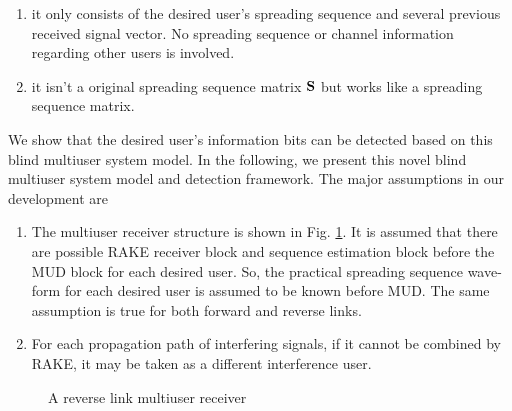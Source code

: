\documentclass[a4paper,11pt,fleqn]{article}
\newcommand{\bS}{{\bf S}}
\begin{document}
\begin{enumerate}

\item it only consists of the desired user's spreading sequence
and several previous received signal vector. No spreading sequence
or channel information regarding other users is involved.

\item it isn't a original spreading sequence matrix $\bS$ but
works like a spreading sequence matrix.

\end{enumerate}

\noindent We show that the desired user's information bits can be
detected based on this blind multiuser system model. In the
following, we present this novel blind multiuser system model and
detection framework. The major assumptions in our development are

\begin{enumerate}

\item The multiuser receiver structure is shown in Fig.
\ref{CDMA_links}. It is assumed that there are possible RAKE
receiver block and sequence estimation block before the MUD block
for each desired user. So, the practical spreading sequence
wave-form for each desired user is assumed to be known before MUD.
The same assumption is true for both forward and reverse links.

\item For each propagation path of interfering signals, if it
cannot be combined by RAKE, it may be taken as a different
interference user.

\end{enumerate}

\begin{figure}
\caption{A reverse link multiuser receiver}\label{CDMA_links}
\end{figure}
\end{document}
